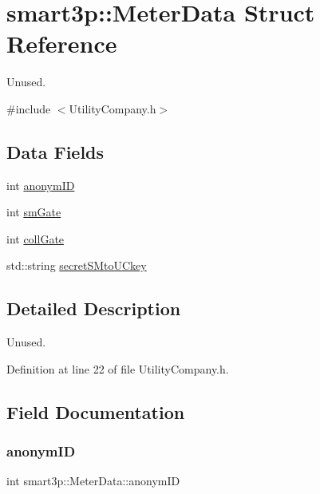 \hypertarget{structsmart3p_1_1MeterData}{}\section{smart3p\+:\+:Meter\+Data Struct Reference}
\label{structsmart3p_1_1MeterData}


Unused.  




{\ttfamily \#include $<$Utility\+Company.\+h$>$}

\subsection*{Data Fields}
\begin{DoxyCompactItemize}
\item 
int \hyperlink{structsmart3p_1_1MeterData_a0d26859885f4fab06e8fe8c29c1ad524}{anonym\+ID}
\item 
int \hyperlink{structsmart3p_1_1MeterData_a6052855ee577dcdd538605f71d8424a4}{sm\+Gate}
\item 
int \hyperlink{structsmart3p_1_1MeterData_a392073328355e46eb0551cbf86240271}{coll\+Gate}
\item 
std\+::string \hyperlink{structsmart3p_1_1MeterData_af2911cd1e548048afd2532aba4d04ce4}{secret\+S\+Mto\+U\+Ckey}
\end{DoxyCompactItemize}


\subsection{Detailed Description}
Unused. 

Definition at line 22 of file Utility\+Company.\+h.



\subsection{Field Documentation}
\mbox{\label{structsmart3p_1_1MeterData_a0d26859885f4fab06e8fe8c29c1ad524}} 
\subsubsection{\texorpdfstring{anonym\+ID}{anonymID}}
{\footnotesize\ttfamily int smart3p\+::\+Meter\+Data\+::anonym\+ID}



